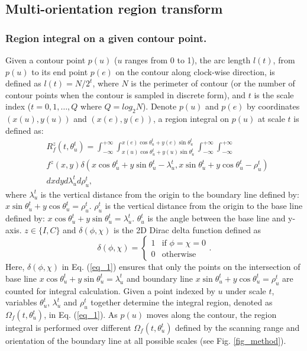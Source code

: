 \documentclass[letterpaper]{article} %
\begin{document}
\subsection{Multi-orientation region transform}
\subsubsection{Region integral on a given contour point.}
Given a contour point $p(u)$ ($u$ ranges from 0 to 1), the arc length $l(t)$, from $p(u)$ to its end point $p(e)$ on the contour along clock-wise direction, is defined as $l(t)=N/2^t$, where $N$ is the perimeter of contour (or the number of contour points when the contour is sampled in discrete form), and $t$ is the scale index ($t=0,1,\dots,Q$ where $Q=log_2 N$). Denote $p(u)$ and $p(e)$ by coordinates $(x(u),y(u))$ and $(x(e),y(e))$, a region integral on $p(u)$ at scale $t$ is defined as:
\begin{equation}
\begin{aligned}
& R_f^z (t,\theta_u^t)
= \int_{-\infty}^{+\infty}\int_{x(u)\cos\theta_u^t+y(u)\sin\theta_u^t}^{x(e)\cos\theta_u^t+y(e)\sin\theta_u^t}\int_{-\infty}^{+\infty}\int_{-\infty}^{+\infty} \\ & f^z (x,y) \delta{(x\cos\theta_u^t+y\sin\theta_u^t-\lambda_u^t,x\sin\theta_u^t+y\cos\theta_u^t-\rho_u^t)} \\ & dxdyd\lambda_u^t d\rho_u^t,
\end{aligned}
\label{eq_1}
\end{equation}
where $ \lambda^t_u$ is the vertical distance from the origin to the boundary line defined by: $ x\sin \theta^t_u+y\cos \theta^t_u=\rho^t_u$. $\rho^t_u$ is the vertical distance from the origin to the base line defined by: $ x\cos \theta^t_u+y\sin \theta^t_u=\lambda^t_u$. $\theta^t_u$ is the angle between the base line and y-axis.  $z \in \{I,C\}$ and $\delta(\phi,\chi)$ is the 2D Dirac delta function defined as
\begin{equation}
\delta(\phi,\chi)=\begin{cases}
1& \text{if $\phi = \chi = 0 $}\\
0& \text{otherwise}
\end{cases}.
\label{eq_2}
\end{equation}
Here, $\delta(\phi,\chi)$ in Eq. (\ref{eq_1}) ensures that only the points on the intersection of base line $ x\cos \theta^t_u+y\sin \theta^t_u=\lambda^t_u$ and boundary line $ x\sin \theta^t_u+y\cos \theta^t_u=\rho^t_u$ are counted for integral calculation. Given a point indexed by $u$ under scale $t$, variables $\theta^t_u$, $\lambda^t_u$ and $\rho^t_u$ together determine the integral region, denoted as $\Omega_f (t,\theta_u^t )$, in Eq. (\ref{eq_1}). As $p(u)$ moves along the contour, the region integral is performed over different $\Omega_f (t,\theta_u^t )$ defined by the scanning range and orientation of the boundary line at all possible scales (see Fig. \ref{fig_method}).
\end{document}
